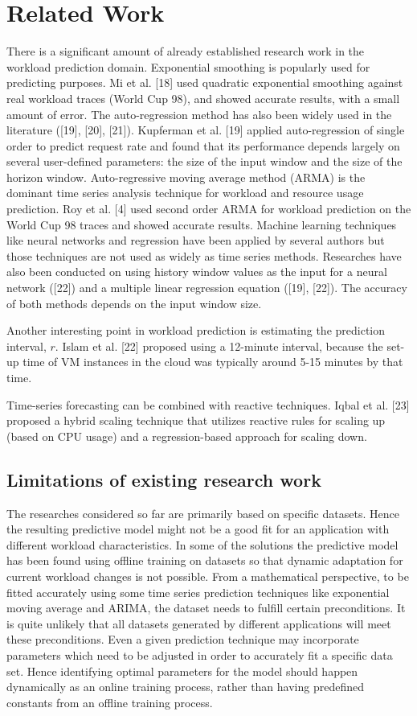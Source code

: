 \section{Related Work}

There is a significant amount of already established research work in the workload prediction domain. Exponential smoothing is popularly used for predicting purposes. Mi et al. [18] used quadratic exponential smoothing against real workload traces (World Cup 98), and showed accurate results, with a small amount of error. The auto-regression method has also been widely used in the literature ([19], [20], [21]). Kupferman et al. [19] applied auto-regression of single order to predict request rate and found that its performance depends largely on several user-defined parameters: the size of the input window and the size of the horizon window. Auto-regressive moving average method (ARMA) is the dominant time series analysis technique for workload and resource usage prediction. Roy et al. [4] used second order ARMA for workload prediction on the World Cup 98 traces and showed accurate results. Machine learning techniques like neural networks and regression have been applied by several authors but those techniques are not used as widely as time series methods. Researches have also been conducted on using history window values as the input for a neural network ([22]) and a multiple linear regression equation ([19], [22]). The accuracy of both methods depends on the input window size.

Another interesting point in workload prediction is estimating the prediction interval, $r$. Islam et al. [22] proposed using a 12-minute interval, because the set-up time of VM instances in the cloud was typically around 5-15 minutes by that time.

Time-series forecasting can be combined with reactive techniques. Iqbal et al. [23] proposed a hybrid scaling technique that utilizes reactive rules for scaling up (based on CPU usage) and a regression-based approach for scaling down.

\subsection{Limitations of existing research work}

The researches considered so far are primarily based on specific datasets. Hence the resulting predictive model might not be a good fit for an application with different workload characteristics. In some of the solutions the predictive model has been found using offline training on datasets so that dynamic adaptation for current workload changes is not possible. 
From a mathematical perspective, to be fitted accurately using some time series prediction techniques like exponential moving average and ARIMA, the dataset needs to fulfill certain preconditions. It is quite unlikely that all datasets generated by different applications will meet these preconditions. Even a given prediction technique may incorporate parameters which need to be adjusted in order to accurately fit a specific data set. Hence identifying optimal parameters for the model should happen dynamically as an online training process, rather than having predefined constants from an offline training process.